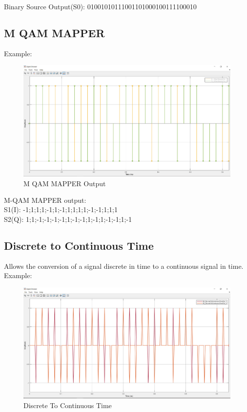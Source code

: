 Binary Source Output(S0): 01001010111001101000100111100010
\subsection*{M QAM MAPPER}
Example:
\begin{figure}[h]
	\centering
	\includegraphics[width=1\textwidth]{../lib/m_qam_transmitter/figures/S1_S2.pdf}
	\caption{M QAM MAPPER Output}\label{fig:M QAM MAPPER Output}
\end{figure}

M-QAM MAPPER output: \\
S1(I): -1;1;1;1;-1;1;-1;1;1;1;1;-1;-1;1;1;1\\
S2(Q): 1;1;-1;-1;-1;-1;1;-1;-1;1;-1;1;-1;-1;1;-1\\

\subsection*{Discrete to Continuous Time}
Allows the conversion of a signal discrete in time to a continuous signal in time.
Example:

\begin{figure}[h]
	\centering
	\includegraphics[width=1\textwidth]{../lib/m_qam_transmitter/figures/S3_S4.pdf}
	\caption{Discrete To Continuous Time}\label{fig:Discrete To Continuous Time}
\end{figure}

